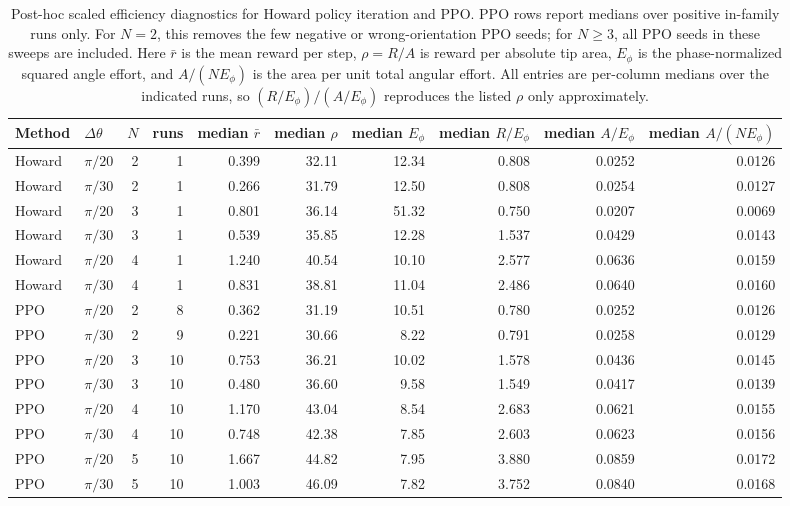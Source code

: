 \documentclass[11pt]{article}
\begin{document}
\begin{table}[htbp]
\centering
\scriptsize
\setlength{\tabcolsep}{4.5pt}
\begin{tabular}{llrrrrrrrr}
\toprule
Method & $\Delta\theta$ & $N$ & runs
& median $\bar r$
& median $\rho$
& median $E_\phi$
& median $R/E_\phi$
& median $A/E_\phi$
& median $A/(N E_\phi)$ \\
\midrule
Howard & $\pi/20$ & 2 & 1  & 0.399 & 32.11 & 12.34 & 0.808 & 0.0252 & 0.0126 \\
Howard & $\pi/30$ & 2 & 1  & 0.266 & 31.79 & 12.50 & 0.808 & 0.0254 & 0.0127 \\
Howard & $\pi/20$ & 3 & 1  & 0.801 & 36.14 & 51.32 & 0.750 & 0.0207 & 0.0069 \\
Howard & $\pi/30$ & 3 & 1  & 0.539 & 35.85 & 12.28 & 1.537 & 0.0429 & 0.0143 \\
Howard & $\pi/20$ & 4 & 1  & 1.240 & 40.54 & 10.10 & 2.577 & 0.0636 & 0.0159 \\
Howard & $\pi/30$ & 4 & 1  & 0.831 & 38.81 & 11.04 & 2.486 & 0.0640 & 0.0160 \\
\midrule
PPO & $\pi/20$ & 2 & 8  & 0.362 & 31.19 & 10.51 & 0.780 & 0.0252 & 0.0126 \\
PPO & $\pi/30$ & 2 & 9  & 0.221 & 30.66 & 8.22  & 0.791 & 0.0258 & 0.0129 \\
PPO & $\pi/20$ & 3 & 10 & 0.753 & 36.21 & 10.02 & 1.578 & 0.0436 & 0.0145 \\
PPO & $\pi/30$ & 3 & 10 & 0.480 & 36.60 & 9.58  & 1.549 & 0.0417 & 0.0139 \\
PPO & $\pi/20$ & 4 & 10 & 1.170 & 43.04 & 8.54  & 2.683 & 0.0621 & 0.0155 \\
PPO & $\pi/30$ & 4 & 10 & 0.748 & 42.38 & 7.85  & 2.603 & 0.0623 & 0.0156 \\
PPO & $\pi/20$ & 5 & 10 & 1.667 & 44.82 & 7.95  & 3.880 & 0.0859 & 0.0172 \\
PPO & $\pi/30$ & 5 & 10 & 1.003 & 46.09 & 7.82  & 3.752 & 0.0840 & 0.0168 \\
\bottomrule
\end{tabular}
\caption{Post-hoc scaled efficiency diagnostics for Howard policy iteration and PPO. PPO rows report medians over positive in-family runs only. For $N=2$, this removes the few negative or wrong-orientation PPO seeds; for $N\geq 3$, all PPO seeds in these sweeps are included. Here $\bar r$ is the mean reward per step, $\rho=R/A$ is reward per absolute tip area, $E_\phi$ is the phase-normalized squared angle effort, and $A/(N E_\phi)$ is the area per unit total angular effort. All entries are per-column medians over the indicated runs, so $(R/E_\phi)/(A/E_\phi)$ reproduces the listed $\rho$ only approximately.}
\label{tab:efficiency}
\end{table}
\end{document}
